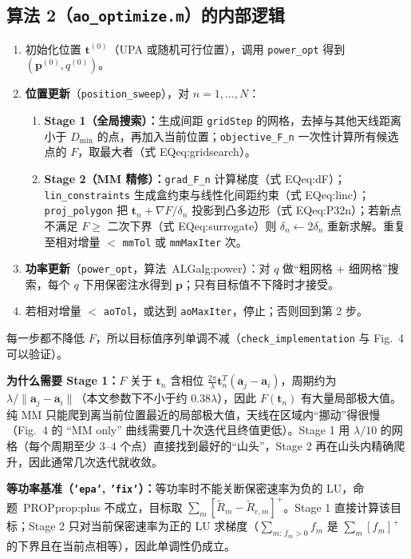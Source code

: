 \documentclass[11pt,a4paper]{ctexart}
\newcommand{\code}[1]{\texttt{#1}}
\newcommand{\bt}{\mathbf t}
\begin{document}
\subsection{算法 2（\code{ao\_optimize.m}）的内部逻辑}
\begin{enumerate}
\item 初始化位置 $\bt^{(0)}$（UPA 或随机可行位置），调用 \code{power\_opt} 得到 $(\mathbf p^{(0)},q^{(0)})$。
\item \textbf{位置更新}（\code{position\_sweep}），对 $n=1,\dots,N$：
  \begin{enumerate}
  \item \textbf{Stage 1（全局搜索）：}生成间距 \code{gridStep} 的网格，去掉与其他天线距离小于 $D_{\min}$ 的点，再加入当前位置；\code{objective\_F\_n} 一次性计算所有候选点的 $F$，取最大者（式 EQ{eq:gridsearch}）。
  \item \textbf{Stage 2（MM 精修）：}\code{grad\_F\_n} 计算梯度（式 EQ{eq:dF}）；\code{lin\_constraints} 生成盒约束与线性化间距约束（式 EQ{eq:linc}）；\code{proj\_polygon} 把 $\bt_n+\nabla F/\delta_n$ 投影到凸多边形（式 EQ{eq:P32n}）；若新点不满足 $F\ge$ 二次下界（式 EQ{eq:surrogate}）则 $\delta_n\leftarrow2\delta_n$ 重新求解。重复至相对增量 $<$ \code{mmTol} 或 \code{mmMaxIter} 次。
  \end{enumerate}
\item \textbf{功率更新}（\code{power\_opt}，算法~ALG{alg:power}）：对 $q$ 做“粗网格 + 细网格”搜索，每个 $q$ 下用保密注水得到 $\mathbf p$；只有目标值不下降时才接受。
\item 若相对增量 $<$ \code{aoTol}，或达到 \code{aoMaxIter}，停止；否则回到第 2 步。
\end{enumerate}
每一步都不降低 $F$，所以目标值序列单调不减（\code{check\_implementation} 与 Fig.~4 可以验证）。

\textbf{为什么需要 Stage 1：}$F$ 关于 $\bt_n$ 含相位 $\frac{2\pi}{\lambda}\bt_n^T(\mathbf a_j-\mathbf a_i)$，周期约为 $\lambda/\|\mathbf a_j-\mathbf a_i\|$（本文参数下不小于约 $0.38\lambda$），因此 $F(\bt_n)$ 有大量局部极大值。纯 MM 只能爬到离当前位置最近的局部极大值，天线在区域内“挪动”得很慢（Fig.~4 的 “MM only” 曲线需要几十次迭代且终值更低）。Stage 1 用 $\lambda/10$ 的网格（每个周期至少 3--4 个点）直接找到最好的“山头”，Stage 2 再在山头内精确爬升，因此通常几次迭代就收敛。

\textbf{等功率基准（\code{'epa'}, \code{'fix'}）：}等功率时不能关断保密速率为负的 LU，命题~PROP{prop:plus} 不成立，目标取 $\sum_m[\tilde R_m-\tilde R_{e,m}]^+$。Stage 1 直接计算该目标；Stage 2 只对当前保密速率为正的 LU 求梯度（$\sum_{m:\,f_m>0}f_m$ 是 $\sum_m[f_m]^+$ 的下界且在当前点相等），因此单调性仍成立。
\end{document}
